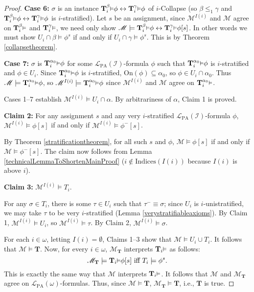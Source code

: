 \documentclass[reqno]{article}
\theoremstyle{definition}
\def\L{\mathscr{L}}
\def\M{\mathscr{M}}
\def\T{\mathbf{T}}
\def\indices{\mathrm{Indices}}
\def\LPA{\L_{\mathrm{PA}}}
\def\indset{\mathcal I}
\def\onset{\mathrm{On}}
\renewcommand{\Pr}[1]{\T_{#1}\mbox{\small${\vDash}$}}
\newcommand{\Prr}[2]{\T^{#1}_{#2}\mbox{\small${\vDash}$}}
\newcommand{\case}[1]{\textbf{Case #1:}}
\newcommand{\claim}[1]{\textbf{Claim #1:}}
\begin{document}
\begin{proof}
\item
\case6
$\sigma$ is an instance $\Prr\beta i\phi\leftrightarrow\Prr\gamma i\phi$
of $i$-Collapse (so $\beta\leq_1\gamma$ and $\Prr\beta i\phi\leftrightarrow\Prr\gamma i\phi$ is
$i$-stratified).
Let $s$ be an assignment,
since $\M^{I(i)}$ and $\M$ agree
on $\Prr\beta i$ and $\Prr\gamma i$, we need only show
$\M\models\Prr\beta i\phi\leftrightarrow\Prr\gamma i\phi[s]$.
In other words we must show $U_i\cap\beta\models\phi^s$
if and only if $U_i\cap\gamma\models\phi^s$.
This is by Theorem \ref{collapsetheorem}.

\item
\case7
$\sigma$ is $\Prr{\alpha_0}i\phi$ for some $\LPA(\indset)$-formula $\phi$
such that $\Prr{\alpha_0}i\phi$ is $i$-stratified and $\phi\in U_i$.
Since $\Prr{\alpha_0}i\phi$
is $i$-stratified, $\onset(\phi)\subseteq\alpha_0$, so $\phi\in U_i\cap\alpha_0$.
Thus $\M\models \Prr{\alpha_0}i\phi$,
so $\M^{I(i)}\models \Prr{\alpha_0}i\phi$ since
$\M^{I(i)}$ and $\M$ agree on $\Prr{\alpha_0}i$.

\item
Cases 1--7
establish $\M^{I(i)}\models U_i\cap\alpha$.
By arbitrariness of $\alpha$, Claim 1 is proved.

\item
\claim2
For any assignment $s$
and any very $i$-stratified $\LPA(\indset)$-formula $\phi$,
$\M^{I(i)}\models\phi[s]$ if and only if
$\M^{I(i)}\models\phi^-[s]$.

\item
By Theorem \ref{stratificationtheorem}, for all such $s$ and $\phi$,
$\M\models\phi[s]$ if and only if $\M\models\phi^-[s]$.
The claim now follows from Lemma \ref{technicalLemmaToShortenMainProof}
($i\not\in\indices(I(i))$ because $I(i)$ is above $i$).

\item
\claim3
$\M^{I(i)}\models T_i$.

\item
For any $\sigma\in T_i$,
there is some $\tau\in U_i$ such that $\tau^-\equiv\sigma$;
since $U_i$ is $i$-unistratified, we may take $\tau$ to be very $i$-stratified
(Lemma \ref{verystratifiableaxioms}).
By Claim 1, $\M^{I(i)}\models U_i$,
so $\M^{I(i)}\models\tau$.
By Claim 2, $\M^{I(i)}\models\sigma$.

\item
For each $i\in\omega$, letting $I(i)=\emptyset$,
Claims 1--3 show that
$\M\models U_i\cup T_i$.
It follows that $\M\models \T$.
Now, for every $i\in\omega$, $\M_\T$ interprets $\Pr i$ as follows:
\[
\M_\T\models \Pr i \phi[s] \mbox{ iff } T_i\models \phi^s.
\]
This is exactly the same way that $\M$ interprets $\Pr i$.
It follows that $\M$ and $\M_\T$ agree on $\LPA(\omega)$-formulas.
Thus, since $\M\models\T$, $\M_\T\models \T$, i.e., $\T$ is true.
\end{proof}
\end{document}
